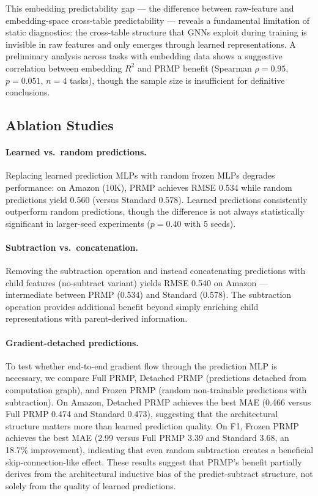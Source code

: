 \documentclass[11pt,letterpaper]{article}
\begin{document}
This embedding predictability gap --- the difference between raw-feature and embedding-space cross-table predictability --- reveals a fundamental limitation of static diagnostics: the cross-table structure that GNNs exploit during training is invisible in raw features and only emerges through learned representations. A preliminary analysis across tasks with embedding data shows a suggestive correlation between embedding $R^2$ and PRMP benefit (Spearman $\rho = 0.95$, $p = 0.051$, $n = 4$ tasks), though the sample size is insufficient for definitive conclusions.

\subsection{Ablation Studies}

\paragraph{Learned vs.\ random predictions.} Replacing learned prediction MLPs with random frozen MLPs degrades performance: on Amazon (10K), PRMP achieves RMSE 0.534 while random predictions yield 0.560 (versus Standard 0.578). Learned predictions consistently outperform random predictions, though the difference is not always statistically significant in larger-seed experiments ($p = 0.40$ with 5 seeds).

\paragraph{Subtraction vs.\ concatenation.} Removing the subtraction operation and instead concatenating predictions with child features (no-subtract variant) yields RMSE 0.540 on Amazon --- intermediate between PRMP (0.534) and Standard (0.578). The subtraction operation provides additional benefit beyond simply enriching child representations with parent-derived information.

\paragraph{Gradient-detached predictions.} To test whether end-to-end gradient flow through the prediction MLP is necessary, we compare Full PRMP, Detached PRMP (predictions detached from computation graph), and Frozen PRMP (random non-trainable predictions with subtraction). On Amazon, Detached PRMP achieves the best MAE (0.466 versus Full PRMP 0.474 and Standard 0.473), suggesting that the architectural structure matters more than learned prediction quality. On F1, Frozen PRMP achieves the best MAE (2.99 versus Full PRMP 3.39 and Standard 3.68, an 18.7\% improvement), indicating that even random subtraction creates a beneficial skip-connection-like effect. These results suggest that PRMP's benefit partially derives from the architectural inductive bias of the predict-subtract structure, not solely from the quality of learned predictions.
\end{document}
